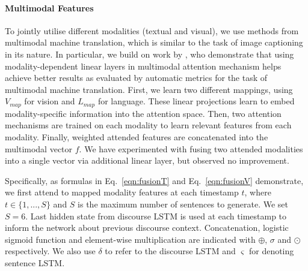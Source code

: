 \documentclass[11pt,a4paper]{article}
\newcommand{\kibitz}[2]{\ifnum\Comments=1\textcolor{#1}{#2}\fi}
\newcommand{\nikolai}[1]{\kibitz{red}   {[Nikolai: #1]}}
\newcommand{\R}{\mathbb{R}}
\begin{document}

\paragraph{Multimodal Features}
To jointly utilise different modalities (textual and visual), we use methods from multimodal machine translation, which is similar to the task of image captioning in its nature.
In particular, we build on work by , who demonstrate that using modality-dependent linear layers in multimodal attention mechanism helps achieve better results as evaluated by automatic metrics for the task of multimodal machine translation.
First, we learn two different mappings, using $V_{map}$ for vision and $L_{map}$ for language.
These linear projections learn to embed modality-specific information into the attention space.
Then, two attention mechanisms are trained on each modality to learn relevant features from each modality.
Finally, weighted attended features are concatenated into the multimodal vector $f$.
We have experimented with fusing two attended modalities into a single vector via additional linear layer, but observed no improvement.

Specifically, as formulas in Eq.~\ref{eqn:fusionT} and Eq.~\ref{eqn:fusionV} demonstrate, we first attend to mapped modality features at each timestamp $t$, where $t \in \{1, ..., S\}$ and $S$ is the maximum number of sentences to generate.
We set $S=6$.
Last hidden state from discourse LSTM is used at each timestamp to inform the network about previous discourse context.
Concatenation, logistic sigmoid function and element-wise multiplication are indicated with $\oplus$, $\sigma$ and $\odot$ respectively.
We also use $\delta$ to refer to the discourse LSTM and $\varsigma$ for denoting sentence LSTM.
\end{document}
